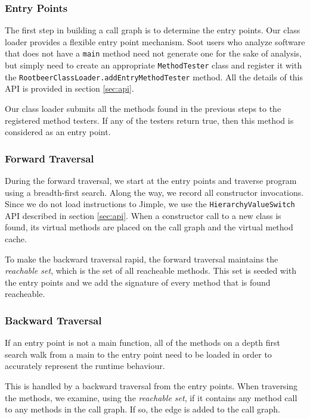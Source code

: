 \documentclass[preprint]{sigplanconf}
\begin{document}
\subsubsection{Entry Points}
The first step in building a call graph is to determine the entry points. Our class loader provides a flexible entry point mechanism. Soot users who analyze software that does not have a {\tt main} method need not generate one for the sake of analysis, but simply need to create an appropriate {\tt MethodTester} class and register it with the {\tt RootbeerClassLoader.addEntryMethodTester} method. All the details of this API is provided in section \ref{sec:api}.

Our class loader submits all the methods found in the previous steps to the registered method testers. If any of the testers return true, then this method is considered as an entry point.

\subsubsection{Forward Traversal}

During the forward traversal, we start at the entry points and traverse program using a breadth-first search. Along the way, we record all constructor invocations. Since we do not load instructions to Jimple, we use the {\tt HierarchyValueSwitch} API described in section \ref{sec:api}.
When a constructor call to a new class is found, its virtual methods are placed on the call graph and the virtual method cache.

To make the backward traversal rapid, the forward traversal maintains the \emph{reachable set}, which is the set of all reacheable methods. This set is seeded with the entry points and we add the signature of every method that is found reacheable.


\subsubsection{Backward Traversal}
If an entry point is not a main function, all of the methods on a depth first search walk from a main to the entry point need to be loaded in order to accurately represent the runtime behaviour.

This is handled by a backward traversal from the entry points. When traversing the methods, we examine, using the \emph{reachable set}, if it contains any method call to any methods in the call graph. If so, the edge is added to the call graph.
\end{document}
